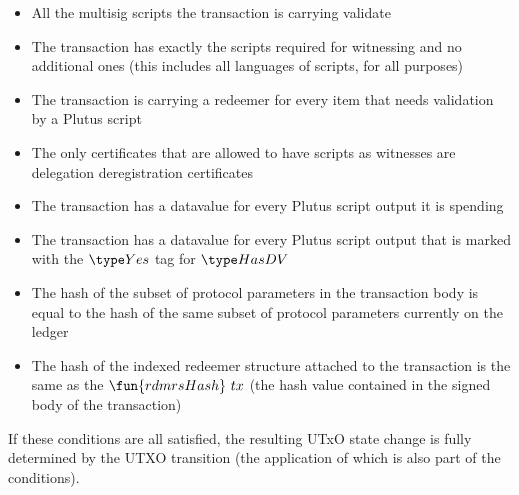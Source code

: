\begin{itemize}

    \item All the multisig scripts the transaction is carrying validate

    \item The transaction has exactly the scripts required for witnessing and no
    additional ones (this includes all languages of scripts, for all purposes)

    \item The transaction is carrying a redeemer for every item that needs
    validation by a Plutus script

    \item The only certificates that are allowed to have scripts as witnesses
    are delegation deregistration certificates

    \item The transaction has a datavalue for every Plutus script output it is spending

    \item The transaction has a datavalue for every Plutus script output that is
    marked with the $\Yes$ tag for $\HasDV$

    \item
    The hash of the subset of protocol parameters in the transaction body is equal to
    the hash of the same subset of protocol parameters currently on the ledger

    \item The hash of the indexed redeemer structure attached to the transaction is
    the same as the $\fun{rdmrsHash}~{tx}$ (the hash value contained in the signed body of
    the transaction)

\end{itemize}

If these conditions are all satisfied, the resulting UTxO state change is fully determined
by the UTXO transition (the application of which is also part of the conditions).

